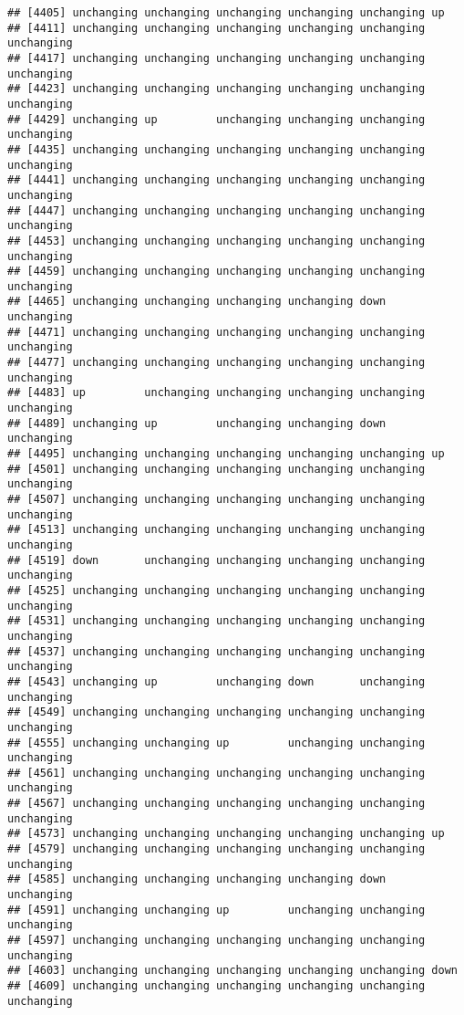 \documentclass[]{article}
\begin{document}
\begin{verbatim}
## [4405] unchanging unchanging unchanging unchanging unchanging up        
## [4411] unchanging unchanging unchanging unchanging unchanging unchanging
## [4417] unchanging unchanging unchanging unchanging unchanging unchanging
## [4423] unchanging unchanging unchanging unchanging unchanging unchanging
## [4429] unchanging up         unchanging unchanging unchanging unchanging
## [4435] unchanging unchanging unchanging unchanging unchanging unchanging
## [4441] unchanging unchanging unchanging unchanging unchanging unchanging
## [4447] unchanging unchanging unchanging unchanging unchanging unchanging
## [4453] unchanging unchanging unchanging unchanging unchanging unchanging
## [4459] unchanging unchanging unchanging unchanging unchanging unchanging
## [4465] unchanging unchanging unchanging unchanging down       unchanging
## [4471] unchanging unchanging unchanging unchanging unchanging unchanging
## [4477] unchanging unchanging unchanging unchanging unchanging unchanging
## [4483] up         unchanging unchanging unchanging unchanging unchanging
## [4489] unchanging up         unchanging unchanging down       unchanging
## [4495] unchanging unchanging unchanging unchanging unchanging up        
## [4501] unchanging unchanging unchanging unchanging unchanging unchanging
## [4507] unchanging unchanging unchanging unchanging unchanging unchanging
## [4513] unchanging unchanging unchanging unchanging unchanging unchanging
## [4519] down       unchanging unchanging unchanging unchanging unchanging
## [4525] unchanging unchanging unchanging unchanging unchanging unchanging
## [4531] unchanging unchanging unchanging unchanging unchanging unchanging
## [4537] unchanging unchanging unchanging unchanging unchanging unchanging
## [4543] unchanging up         unchanging down       unchanging unchanging
## [4549] unchanging unchanging unchanging unchanging unchanging unchanging
## [4555] unchanging unchanging up         unchanging unchanging unchanging
## [4561] unchanging unchanging unchanging unchanging unchanging unchanging
## [4567] unchanging unchanging unchanging unchanging unchanging unchanging
## [4573] unchanging unchanging unchanging unchanging unchanging up        
## [4579] unchanging unchanging unchanging unchanging unchanging unchanging
## [4585] unchanging unchanging unchanging unchanging down       unchanging
## [4591] unchanging unchanging up         unchanging unchanging unchanging
## [4597] unchanging unchanging unchanging unchanging unchanging unchanging
## [4603] unchanging unchanging unchanging unchanging unchanging down      
## [4609] unchanging unchanging unchanging unchanging unchanging unchanging

\end{verbatim}
\end{document}
